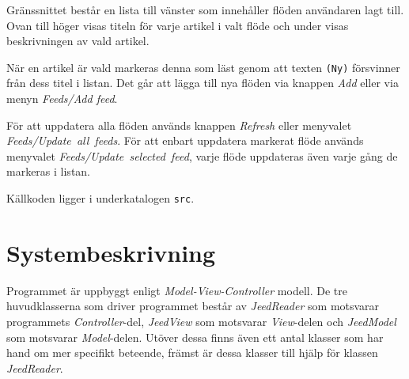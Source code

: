 \documentclass[a4paper, 12pt]{article}
\begin{document}
Gränssnittet består en lista till vänster som innehåller flöden
användaren lagt till. Ovan till höger visas titeln för varje artikel i
valt flöde och under visas beskrivningen av vald artikel.

När en artikel är vald markeras denna som läst genom att texten
\verb!(Ny)! försvinner från dess titel i listan. Det går att lägga
till nya flöden via knappen \textit{Add} eller via menyn
\textit{Feeds/Add feed}.

För att uppdatera alla flöden används knappen \textit{Refresh} eller
menyvalet \textit{Feeds/Update~all~feeds}. För att enbart uppdatera
markerat flöde används menyvalet \textit{Feeds/Update~selected~feed},
varje flöde uppdateras även varje gång de markeras i listan.

Källkoden ligger i underkatalogen \verb!src!.

\section{Systembeskrivning}\label{Systembeskrivning}
Programmet är uppbyggt enligt \textit{Model-View-Controller}
modell. De tre huvudklasserna som driver programmet består av
\textit{JeedReader} som motsvarar programmets \textit{Controller}-del,
\textit{JeedView} som motsvarar \textit{View}-delen och
\textit{JeedModel} som motsvarar \textit{Model}-delen. Utöver dessa
finns även ett antal klasser som har hand om mer specifikt beteende,
främst är dessa klasser till hjälp för klassen \textit{JeedReader}.

\newpage
\begin{figure}[H]
  \begin{center}
    \caption{}
    \label{fig:classUML}
  \end{center}
\end{figure}
\end{document}
